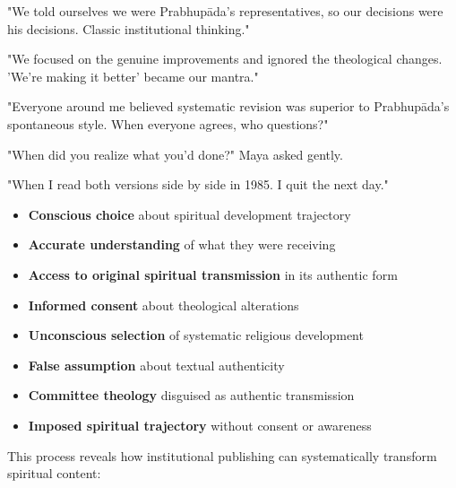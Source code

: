 \documentclass[12pt,twoside]{book}
\begin{document}
"We told ourselves we were Prabhupāda's representatives, so our decisions were his decisions. Classic institutional thinking."

"We focused on the genuine improvements and ignored the theological changes. 'We're making it better' became our mantra."

"Everyone around me believed systematic revision was superior to Prabhupāda's spontaneous style. When everyone agrees, who questions?"

"When did you realize what you'd done?" Maya asked gently.

"When I read both versions side by side in 1985. I quit the next day."

\begin{itemize}
\item \textbf{\textbf{Conscious choice}} about spiritual development trajectory
\item \textbf{\textbf{Accurate understanding}} of what they were receiving
\item \textbf{\textbf{Access to original spiritual transmission}} in its authentic form
\item \textbf{\textbf{Informed consent}} about theological alterations

\item \textbf{\textbf{Unconscious selection}} of systematic religious development
\item \textbf{\textbf{False assumption}} about textual authenticity
\item \textbf{\textbf{Committee theology}} disguised as authentic transmission
\item \textbf{\textbf{Imposed spiritual trajectory}} without consent or awareness
\end{itemize}

This process reveals how institutional publishing can systematically transform spiritual content:
\end{document}
